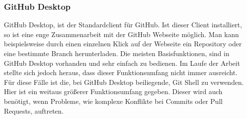 \documentclass[FIPLY_base.tex]{subfiles}
\begin{document}
\subsubsection{GitHub Desktop}
GitHub Desktop, ist der Standardclient für GitHub.
Ist dieser Client installiert, so ist eine enge Zusammenarbeit mit der GitHub Webseite möglich.
Man kann beispielsweise durch einen einzelnen Klick auf der Webseite ein Repository oder eine bestimmte Branch herunterladen.
Die meisten Basisfunktionen, sind in GitHub Desktop vorhanden und sehr einfach zu bedienen.
Im Laufe der Arbeit stellte sich jedoch heraus, dass dieser Funktionsumfang nicht immer ausreicht.
Für diese Fälle ist die, bei GitHub Desktop beiliegende, Git Shell zu verwenden.
Hier ist ein weitaus größerer Funktionsumfang gegeben.
Dieser wird auch benötigt, wenn Probleme, wie komplexe Konflikte bei Commits oder Pull Requests, auftreten.
\end{document}
